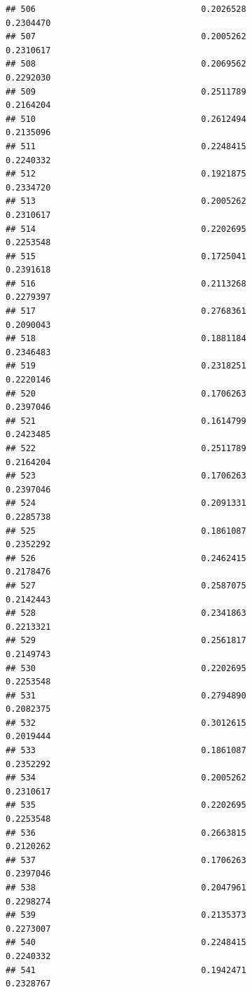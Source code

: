 \documentclass[
  american,
  man,floatsintext]{apa7}
\begin{document}
\begin{verbatim}
## 506                                 0.2026528               0.2304470
## 507                                 0.2005262               0.2310617
## 508                                 0.2069562               0.2292030
## 509                                 0.2511789               0.2164204
## 510                                 0.2612494               0.2135096
## 511                                 0.2248415               0.2240332
## 512                                 0.1921875               0.2334720
## 513                                 0.2005262               0.2310617
## 514                                 0.2202695               0.2253548
## 515                                 0.1725041               0.2391618
## 516                                 0.2113268               0.2279397
## 517                                 0.2768361               0.2090043
## 518                                 0.1881184               0.2346483
## 519                                 0.2318251               0.2220146
## 520                                 0.1706263               0.2397046
## 521                                 0.1614799               0.2423485
## 522                                 0.2511789               0.2164204
## 523                                 0.1706263               0.2397046
## 524                                 0.2091331               0.2285738
## 525                                 0.1861087               0.2352292
## 526                                 0.2462415               0.2178476
## 527                                 0.2587075               0.2142443
## 528                                 0.2341863               0.2213321
## 529                                 0.2561817               0.2149743
## 530                                 0.2202695               0.2253548
## 531                                 0.2794890               0.2082375
## 532                                 0.3012615               0.2019444
## 533                                 0.1861087               0.2352292
## 534                                 0.2005262               0.2310617
## 535                                 0.2202695               0.2253548
## 536                                 0.2663815               0.2120262
## 537                                 0.1706263               0.2397046
## 538                                 0.2047961               0.2298274
## 539                                 0.2135373               0.2273007
## 540                                 0.2248415               0.2240332
## 541                                 0.1942471               0.2328767

\end{verbatim}
\end{document}
